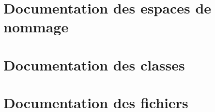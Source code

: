 \documentclass[twoside]{article}
\newcommand{\+}{\discretionary{\mbox{\scriptsize$\hookleftarrow$}}{}{}}
\newcommand{\clearemptydoublepage}{%
  \newpage{\pagestyle{empty}\cleardoublepage}%
}
\begin{document}
\section{Documentation des espaces de nommage}

\section{Documentation des classes}















\section{Documentation des fichiers}


































\newpage
{}
\clearemptydoublepage
{}
\printindex
\end{document}
